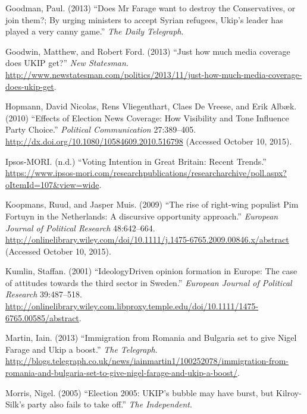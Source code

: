 \documentclass[12pt,article]{article}
\begin{document}
Goodman, Paul. (2013) ``Does Mr Farage want to destroy the
Conservatives, or join them?; By urging ministers to accept Syrian
refugees, Ukip's leader has played a very canny game.'' \emph{The Daily
Telegraph}.

Goodwin, Matthew, and Robert Ford. (2013) ``Just how much media coverage
does UKIP get?'' \emph{New Statesman}.
\url{http://www.newstatesman.com/politics/2013/11/just-how-much-media-coverage-does-ukip-get}.

Hopmann, David Nicolas, Rens Vliegenthart, Claes De Vreese, and Erik
Albæk. (2010) ``Effects of Election News Coverage: How Visibility and
Tone Influence Party Choice.'' \emph{Political Communication}
27:389--405. \url{http://dx.doi.org/10.1080/10584609.2010.516798}
(Accessed October 10, 2015).

Ipsos-MORI. (n.d.) ``Voting Intention in Great Britain: Recent Trends.''
\url{https://www.ipsos-mori.com/researchpublications/researcharchive/poll.aspx?oItemId=107\&view=wide}.

Koopmans, Ruud, and Jasper Muis. (2009) ``The rise of right-wing
populist Pim Fortuyn in the Netherlands: A discursive opportunity
approach.'' \emph{European Journal of Political Research} 48:642--664.
\url{http://onlinelibrary.wiley.com/doi/10.1111/j.1475-6765.2009.00846.x/abstract}
(Accessed October 10, 2015).

Kumlin, Staffan. (2001) ``IdeologyDriven opinion formation in Europe:
The case of attitudes towards the third sector in Sweden.''
\emph{European Journal of Political Research} 39:487--518.
\url{http://onlinelibrary.wiley.com.libproxy.temple.edu/doi/10.1111/1475-6765.00585/abstract}.

Martin, Iain. (2013) ``Immigration from Romania and Bulgaria set to give
Nigel Farage and Ukip a boost.'' \emph{The Telegraph}.
\url{http://blogs.telegraph.co.uk/news/iainmartin1/100252078/immigration-from-romania-and-bulgaria-set-to-give-nigel-farage-and-ukip-a-boost/}.

Morris, Nigel. (2005) ``Election 2005: UKIP's bubble may have burst, but
Kilroy-Silk's party also fails to take off.'' \emph{The Independent}.
\end{document}
